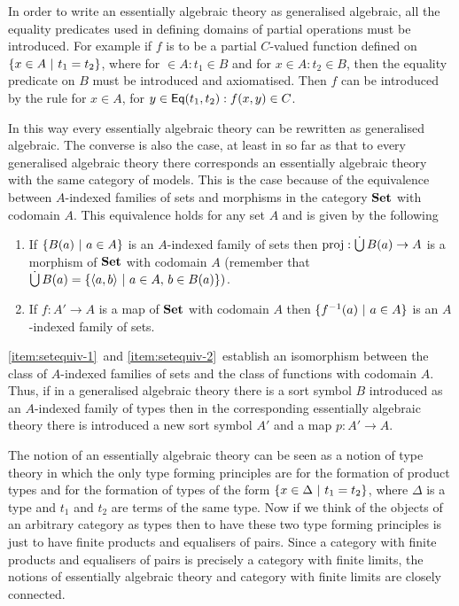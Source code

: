 In order to write an essentially algebraic theory as generalised algebraic, all the equality predicates used in defining domains of partial operations must be introduced.
%
For example if $f$ is to be a partial $C$-valued function defined on $\{ x \in A \ |\  t_1 = t_2 \}$, where for $ \in A : t_1 \in B$ and for $x \in A : t_2 \in B$, then the equality predicate on $B$ must be introduced and axiomatised.
%
Then $f$ can be introduced by the rule for $x \in A$, for $y \in \mathsf{Eq}(t_1,t_2) : f(x,y) \in C$.


In this way every essentially algebraic theory can be rewritten as generalised algebraic.
%
The converse is also the case, at least in so far as that to every generalised algebraic theory there corresponds an essentially algebraic theory with the same category of models.
%
This is the case because of the equivalence between $A$-indexed families of sets and morphisms in the category $\mathbf{Set}$ with codomain $A$.
%
This equivalence holds for any set $A$ and is given by the following

\begin{enumerate}[1.]
  \item \label{item:setequiv-1} If $\{ B(a) \ |\  a \in A \}$ is an $A$-indexed family of sets then $\operatorname{proj} : \mathop{\dot{\bigcup}} B(a) \to A$ is a morphism of $\mathbf{Set}$ with codomain $A$ (remember that $\mathop{\dot{\bigcup}} B(a) = \{\langle a,b \rangle \ |\  a \in A,\, b \in B(a) \})$.
  \item \label{item:setequiv-2} If $f : A' \to A$ is a map of $\mathbf{Set}$ with codomain $A$ then $\{ f^{-1}(a) \ |\  a \in A \}$ is an $A$-indexed family of sets.
\end{enumerate}

\ref{item:setequiv-1}~and \ref{item:setequiv-2}~establish an isomorphism between the class of $A$-indexed families of sets and the class of functions with codomain $A$.
%
%
Thus, if in a generalised algebraic theory there is a sort symbol $B$ introduced as an $A$-indexed family of types then in the corresponding essentially algebraic theory there is introduced a new sort symbol $A'$ and a map $p : A' \to A$.

The notion of an essentially algebraic theory can be seen as a notion of type theory in which the only type forming principles are for the formation of product types and for the formation of types of the form $\{ x \in \Delta \ |\  t_1 = t_2 \}$, where $\Delta$ is a type and $t_1$ and $t_2$ are terms of the same type.
%
Now if we think of the objects of an arbitrary category as types then to have these two type forming principles is just to have finite products and equalisers of pairs.
%
%
Since a category with finite products and equalisers of pairs is precisely a category with finite limits, the notions of essentially algebraic theory and category with finite limits are closely connected.


